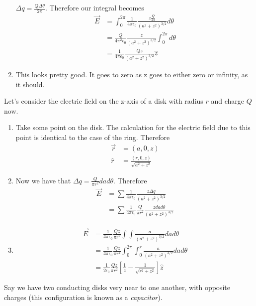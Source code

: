 \documentclass[nobib]{tufte-handout}
\begin{document}
\begin{enumerate}
    $\Delta q = \frac{Q \Delta \theta}{2 \pi}$. 
    Therefore our integral becomes 
    \begin{align*}
        \vec{E} &= \int_0^{2 \pi} \frac{1}{4 \pi \epsilon_0} \frac{z \frac{Q}{2 \pi}}{(a^2+z^2)^{3/2}} d \theta \\
        &= \frac{Q}{4 {\pi}^2 \epsilon_0}\frac{z}{{(a^2+z^2)^{3/2}}} \int_{0}^{2\pi}d\theta \\
        &= \frac{1}{4 \pi \epsilon_0}\frac{Qz}{{(a^2+z^2)^{3/2}}}\hat{z}
    \end{align*}
    \item This looks pretty good. It goes to zero as z goes to either zero or infinity, as it should. 
\end{enumerate}
Let's consider the electric field on the z-axis of a disk with radius $r$ and charge $Q$ now. 
\begin{enumerate}
    \item Take some point on the disk. The calculation for the electric field due to 
    this point is identical to the case of the ring. Therefore 
    \begin{align*}
        \vec{r} &= (a,0,z) \\
        \hat{r} &= \frac{(r,0,z)}{\sqrt{a^2+z^2}}
    \end{align*}
    \item Now we have that $\Delta q = \frac{Q}{\pi r^2} da d\theta$. Therefore
    \begin{align*}
        \vec{E} &= \sum \frac{1}{4 \pi \epsilon_0}\frac{z \Delta q}{(a^2+z^2)^{3/2}} \\
        &= \sum \frac{1}{4 \pi \epsilon_0} \frac{Q}{\pi r^2} \frac{z da d\theta}{(a^2+z^2)^{3/2}}
    \end{align*}
    \item 
    \begin{align*}
        \vec{E} &= \frac{1}{4 \pi \epsilon_0} \frac{Qz}{\pi r^2} \int \int \frac{a}{(a^2+z^2)^{3/2}} da d \theta \\
        &= \frac{1}{4 \pi \epsilon_0} \frac{Qz}{\pi r^2} \int_{0}^{2 \pi} \int_0^{r} \frac{a}{(a^2+z^2)^{3/2}} da d \theta \\
        &= \frac{1}{2 \epsilon_0} \frac{Qz}{\pi r^2} \left[\frac{1}{z} - \frac{1}{\sqrt{r^2 + z^2}}\right] \hat{z}
    \end{align*}
\end{enumerate}
Say we have two conducting disks very near to one another, with opposite charges 
(this configuration is known as a \emph{capacitor}). 
\end{document}
